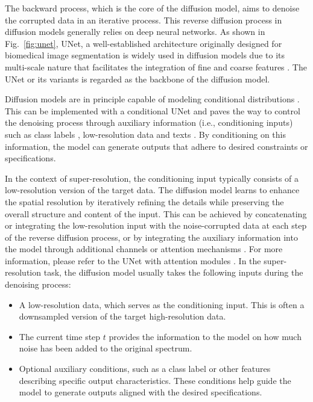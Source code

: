 The backward process, which is the core of the diffusion model, aims to denoise the corrupted data in an iterative process. 
This reverse diffusion process in diffusion models generally relies on deep neural networks. As shown in Fig.~\ref{fig:unet}, UNet, a well-established architecture originally designed for biomedical image segmentation is widely used in diffusion models due to its multi-scale nature that facilitates the integration of fine and coarse features \cite{unet}. 
The UNet or its variants \cite{unet,AttentionUnet} is regarded as the backbone of the diffusion model.


Diffusion models are in principle capable of modeling
conditional distributions \cite{ldm,glide,dalle2}.
This can be implemented with a conditional UNet and paves the way to control the denoising process through auxiliary information (i.e., conditioning inputs) such as class labels \cite{dhariwal2021diffusion}, low-resolution data \cite{saharia2022image} and texts \cite{glide,dalle2}.
By conditioning on this information, the model can generate outputs that adhere to desired constraints or specifications.

In the context of super-resolution, the conditioning input typically consists of a low-resolution version of the target data. The diffusion model learns to enhance the spatial resolution by iteratively refining the details while preserving the overall structure and content of the input. This can be achieved by concatenating or integrating the low-resolution input with the noise-corrupted data at each step of the reverse diffusion process, or by integrating the auxiliary information into the model through additional channels or attention mechanisms \cite{vaswani2017attention}. For more information, please refer to the UNet with attention modules \cite{AttentionUnet}.
In the super-resolution task, the diffusion model usually takes the following inputs during the denoising process:
\begin{itemize}
    \item A low-resolution data, which serves as the conditioning input. This is often a downsampled version of the target high-resolution data.
    \item The current time step \( t \) provides the information to the model on how much noise has been added to the original spectrum.
    \item Optional auxiliary conditions, such as a class label or other features describing specific output characteristics. These conditions help guide the model to generate outputs aligned with the desired specifications.
\end{itemize}

